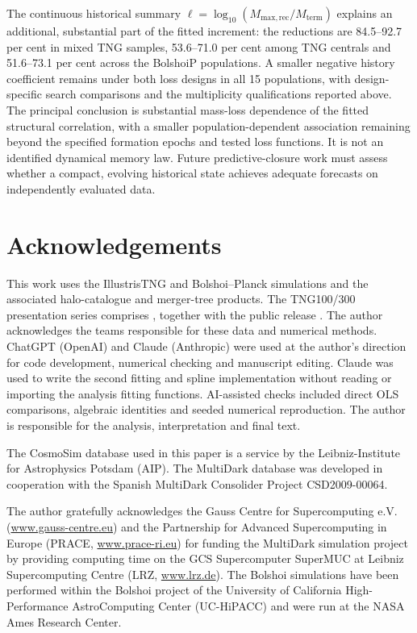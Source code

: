 \documentclass[11pt,a4paper]{article}
\newcommand{\Mrec}{M_{\mathrm{max,rec}}}
\newcommand{\Mterm}{M_{\mathrm{term}}}
\begin{document}
The continuous historical summary $\ell=\log_{10}(\Mrec/\Mterm)$ explains an additional, substantial part of the fitted increment: the reductions are 84.5--92.7 per cent in mixed TNG samples, 53.6--71.0 per cent among TNG centrals and 51.6--73.1 per cent across the BolshoiP populations. A smaller negative history coefficient remains under both loss designs in all 15 populations, with design-specific search comparisons and the multiplicity qualifications reported above. The principal conclusion is substantial mass-loss dependence of the fitted structural correlation, with a smaller population-dependent association remaining beyond the specified formation epochs and tested loss functions. It is not an identified dynamical memory law. Future predictive-closure work must assess whether a compact, evolving historical state achieves adequate forecasts on independently evaluated data.

\section*{Acknowledgements}
This work uses the IllustrisTNG and Bolshoi--Planck simulations and the associated halo-catalogue and merger-tree products. The TNG100/300 presentation series comprises \citet{Pillepich2018,Springel2018,Nelson2018,Naiman2018,Marinacci2018}, together with the public release \citep{Nelson2019}. The author acknowledges the teams responsible for these data and numerical methods. ChatGPT (OpenAI) and Claude (Anthropic) were used at the author's direction for code development, numerical checking and manuscript editing. Claude was used to write the second fitting and spline implementation without reading or importing the analysis fitting functions. AI-assisted checks included direct OLS comparisons, algebraic identities and seeded numerical reproduction. The author is responsible for the analysis, interpretation and final text.


The CosmoSim database used in this paper is a service by the Leibniz-Institute for Astrophysics Potsdam (AIP). The MultiDark database was developed in cooperation with the Spanish MultiDark Consolider Project CSD2009-00064.

The author gratefully acknowledges the Gauss Centre for Supercomputing e.V. (\url{www.gauss-centre.eu}) and the Partnership for Advanced Supercomputing in Europe (PRACE, \url{www.prace-ri.eu}) for funding the MultiDark simulation project by providing computing time on the GCS Supercomputer SuperMUC at Leibniz Supercomputing Centre (LRZ, \url{www.lrz.de}). The Bolshoi simulations have been performed within the Bolshoi project of the University of California High-Performance AstroComputing Center (UC-HiPACC) and were run at the NASA Ames Research Center.
\end{document}
